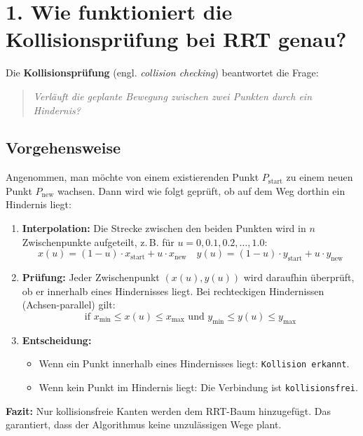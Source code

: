 \documentclass[12pt]{article}
\begin{document}
\section*{1. Wie funktioniert die Kollisionsprüfung bei RRT genau?}

Die \textbf{Kollisionsprüfung} (engl. \textit{collision checking}) beantwortet die Frage:
\begin{quote}
    \emph{Verläuft die geplante Bewegung zwischen zwei Punkten durch ein Hindernis?}
\end{quote}

\subsection*{Vorgehensweise}

Angenommen, man möchte von einem existierenden Punkt $P_{\text{start}}$ zu einem neuen Punkt $P_{\text{new}}$ wachsen. Dann wird wie folgt geprüft, ob auf dem Weg dorthin ein Hindernis liegt:

\begin{enumerate}
    \item \textbf{Interpolation:} Die Strecke zwischen den beiden Punkten wird in $n$ Zwischenpunkte aufgeteilt, z.\,B. für $u = 0, 0.1, 0.2, \dots, 1.0$:
    \[
    x(u) = (1 - u) \cdot x_{\text{start}} + u \cdot x_{\text{new}}
    \quad
    y(u) = (1 - u) \cdot y_{\text{start}} + u \cdot y_{\text{new}}
    \]
    
    \item \textbf{Prüfung:} Jeder Zwischenpunkt $(x(u), y(u))$ wird daraufhin überprüft, ob er innerhalb eines Hindernisses liegt. Bei rechteckigen Hindernissen (Achsen-parallel) gilt:
    \[
    \text{if } x_\text{min} \leq x(u) \leq x_\text{max} \text{ und } y_\text{min} \leq y(u) \leq y_\text{max}
    \]
    \item \textbf{Entscheidung:}
    \begin{itemize}
        \item Wenn ein Punkt innerhalb eines Hindernisses liegt: \texttt{Kollision erkannt}.
        \item Wenn kein Punkt im Hindernis liegt: Die Verbindung ist \texttt{kollisionsfrei}.
    \end{itemize}
\end{enumerate}

\noindent
\textbf{Fazit:} Nur kollisionsfreie Kanten werden dem RRT-Baum hinzugefügt. Das garantiert, dass der Algorithmus keine unzulässigen Wege plant.
\end{document}
